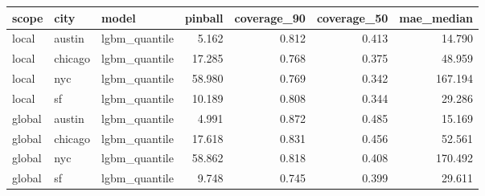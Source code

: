 \begin{tabular}{lllrrrr}
\toprule
scope & city & model & pinball & coverage\_90 & coverage\_50 & mae\_median \\
\midrule
local & austin & lgbm\_quantile & 5.162 & 0.812 & 0.413 & 14.790 \\
local & chicago & lgbm\_quantile & 17.285 & 0.768 & 0.375 & 48.959 \\
local & nyc & lgbm\_quantile & 58.980 & 0.769 & 0.342 & 167.194 \\
local & sf & lgbm\_quantile & 10.189 & 0.808 & 0.344 & 29.286 \\
global & austin & lgbm\_quantile & 4.991 & 0.872 & 0.485 & 15.169 \\
global & chicago & lgbm\_quantile & 17.618 & 0.831 & 0.456 & 52.561 \\
global & nyc & lgbm\_quantile & 58.862 & 0.818 & 0.408 & 170.492 \\
global & sf & lgbm\_quantile & 9.748 & 0.745 & 0.399 & 29.611 \\
\bottomrule
\end{tabular}
